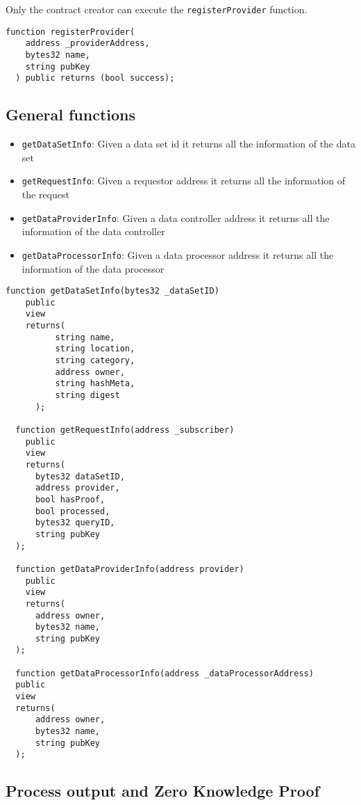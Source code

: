 Only the contract creator can execute the \verb|registerProvider| function.

\begin{lstlisting}[language=Solidity, caption={Data controller registration function}]
  function registerProvider(
    address _providerAddress,
    bytes32 name,
    string pubKey
  ) public returns (bool success);
\end{lstlisting}

\subsection{General functions}
\label{implemenation:contracts:general}

\begin{itemize}
  \item \verb|getDataSetInfo|: Given a data set id it returns all the information of the data set
  \item \verb|getRequestInfo|: Given a requestor address it returns all the information of the request
  \item \verb|getDataProviderInfo|: Given a data controller address it returns all the information of the data controller
  \item \verb|getDataProcessorInfo|: Given a data processor address it returns all the information of the data processor
\end{itemize}

\begin{lstlisting}[language=Solidity, caption={General functions}]
  function getDataSetInfo(bytes32 _dataSetID)
    public
    view
    returns(
          string name,
          string location,
          string category,
          address owner,
          string hashMeta,
          string digest
      );

  function getRequestInfo(address _subscriber)
    public
    view
    returns(
      bytes32 dataSetID,
      address provider,
      bool hasProof,
      bool processed,
      bytes32 queryID,
      string pubKey
  );

  function getDataProviderInfo(address provider)
    public
    view
    returns(
      address owner,
      bytes32 name,
      string pubKey
  );

  function getDataProcessorInfo(address _dataProcessorAddress)
  public
  view
  returns(
      address owner,
      bytes32 name,
      string pubKey
  );
\end{lstlisting}

\subsection{Process output and Zero Knowledge Proof}
\label{implemenation:contracts:zkp}

